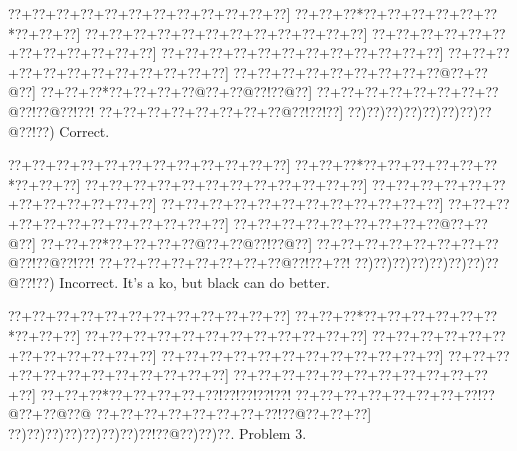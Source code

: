 \documentclass[a5paper]{article}
\begin{document}
\begin{center}
{\goo
\0??+\0??+\0??+\0??+\0??+\0??+\0??+\0??+\0??+\0??+\0??+\0??]
\0??+\0??+\0??*\0??+\0??+\0??+\0??+\0??+\0??*\0??+\0??+\0??]
\0??+\0??+\0??+\0??+\0??+\0??+\0??+\0??+\0??+\0??+\0??+\0??]
\0??+\0??+\0??+\0??+\0??+\0??+\0??+\0??+\0??+\0??+\0??+\0??]
\0??+\0??+\0??+\0??+\0??+\0??+\0??+\0??+\0??+\0??+\0??+\0??]
\0??+\0??+\0??+\0??+\0??+\0??+\0??+\0??+\0??+\0??+\0??+\0??]
\0??+\0??+\0??+\0??+\0??+\0??+\0??+\0??+\0??@\0??+\0??@\0??]
\0??+\0??+\0??*\0??+\0??+\0??+\0??@\0??+\0??@\0??!\0??@\0??]
\0??+\0??+\0??+\0??+\0??+\0??+\0??+\0??@\0??!\0??@\0??!\0??!
\0??+\0??+\0??+\0??+\0??+\0??+\0??+\0??@\0??!\0??!\0??]
\0??)\0??)\0??)\0??)\0??)\0??)\0??)\0??@\0??!\0??)
}
Correct. 

\end{center}
\begin{center}
{\goo
\0??+\0??+\0??+\0??+\0??+\0??+\0??+\0??+\0??+\0??+\0??+\0??]
\0??+\0??+\0??*\0??+\0??+\0??+\0??+\0??+\0??*\0??+\0??+\0??]
\0??+\0??+\0??+\0??+\0??+\0??+\0??+\0??+\0??+\0??+\0??+\0??]
\0??+\0??+\0??+\0??+\0??+\0??+\0??+\0??+\0??+\0??+\0??+\0??]
\0??+\0??+\0??+\0??+\0??+\0??+\0??+\0??+\0??+\0??+\0??+\0??]
\0??+\0??+\0??+\0??+\0??+\0??+\0??+\0??+\0??+\0??+\0??+\0??]
\0??+\0??+\0??+\0??+\0??+\0??+\0??+\0??+\0??@\0??+\0??@\0??]
\0??+\0??+\0??*\0??+\0??+\0??+\0??@\0??+\0??@\0??!\0??@\0??]
\0??+\0??+\0??+\0??+\0??+\0??+\0??+\0??@\0??!\0??@\0??!\0??!
\0??+\0??+\0??+\0??+\0??+\0??+\0??+\0??@\0??!\0??+\0??!
\0??)\0??)\0??)\0??)\0??)\0??)\0??)\0??@\0??!\0??)
}
Incorrect. It's a ko, but black can do better. 

\end{center}
\newpage
\begin{center}
{\goo
\0??+\0??+\0??+\0??+\0??+\0??+\0??+\0??+\0??+\0??+\0??+\0??]
\0??+\0??+\0??*\0??+\0??+\0??+\0??+\0??+\0??*\0??+\0??+\0??]
\0??+\0??+\0??+\0??+\0??+\0??+\0??+\0??+\0??+\0??+\0??+\0??]
\0??+\0??+\0??+\0??+\0??+\0??+\0??+\0??+\0??+\0??+\0??+\0??]
\0??+\0??+\0??+\0??+\0??+\0??+\0??+\0??+\0??+\0??+\0??+\0??]
\0??+\0??+\0??+\0??+\0??+\0??+\0??+\0??+\0??+\0??+\0??+\0??]
\0??+\0??+\0??+\0??+\0??+\0??+\0??+\0??+\0??+\0??+\0??+\0??]
\0??+\0??+\0??*\0??+\0??+\0??+\0??+\0??!\0??!\0??!\0??!\0??!
\0??+\0??+\0??+\0??+\0??+\0??+\0??+\0??!\0??@\0??+\0??@\0??@
\0??+\0??+\0??+\0??+\0??+\0??+\0??+\0??!\0??@\0??+\0??+\0??]
\0??)\0??)\0??)\0??)\0??)\0??)\0??)\0??!\0??@\0??)\0??)\0??.
}
Problem 3.

\end{center}
\end{document}

